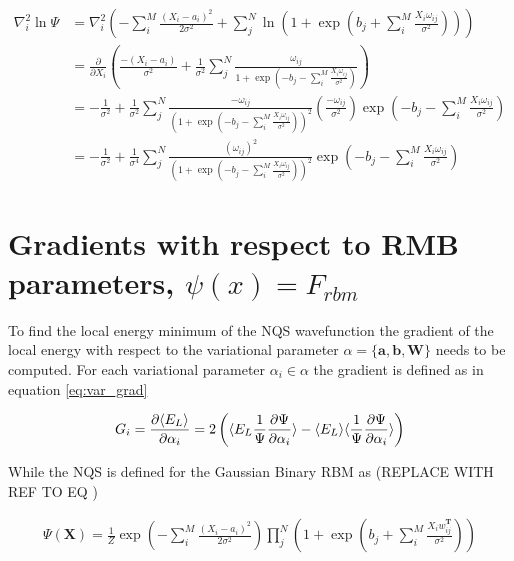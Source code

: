 \begin{align*}
\nabla_i^2 \ln \Psi &= \nabla_i^2 \left( - \sum_{i}^{M} \frac{(X_i - a_i)^2}{2 \sigma^2} +  \sum_{j}^{N} \ln \left( 1 + \exp \left( b_j + \sum_{i}^{M} \frac{X_i \omega_{ij}}{\sigma^2} \right) \right) \right) \\
&= \frac{\partial}{\partial X_i} \left( \frac{-(X_i - a_i)}{\sigma^2} + \frac{1}{\sigma^2} \sum_{j}^{N} \frac{\omega_{ij}}{1 + \exp \left( -b_j - \sum_{i}^{M} \frac{X_i \omega_{ij}}{\sigma^2} \right)} \right) \\
&= -\frac{1}{\sigma^2} + \frac{1}{\sigma^2} \sum_{j}^{N} \frac{-\omega_{ij}}{\left(1 + \exp \left( -b_j - \sum_{i}^{M} \frac{X_i \omega_{ij}}{\sigma^2} \right)\right)^2} \left( \frac{-\omega_{ij}}{\sigma^2} \right) \exp \left( -b_j - \sum_{i}^{M} \frac{X_i \omega_{ij}}{\sigma^2} \right) \\
&= -\frac{1}{\sigma^2} + \frac{1}{\sigma^4} \sum_{j}^{N} \frac{\left(\omega_{ij}\right)^2  }{\left(1 + \exp \left( -b_j - \sum_{i}^{M} \frac{X_i \omega_{ij}}{\sigma^2} \right)\right)^2}\exp \left( -b_j - \sum_{i}^{M} \frac{X_i \omega_{ij}}{\sigma^2} \right) 
\end{align*}

\section{Gradients with respect to RMB parameters, $\psi(x) = F_{rbm}$}\label{sec:GD}

To find the local energy minimum of the NQS wavefunction the  gradient of the local energy with respect to the variational parameter $\alpha  = \{\mathbf{a}, \mathbf{b}, \mathbf{W} \}$ needs to be computed. For each variational parameter $\alpha_i \in \alpha$ the gradient is defined as in equation \ref{eq:var_grad} 

\begin{equation}\label{eq:var_grad}
G_i = \frac{\partial \langle E_L \rangle}{\partial \alpha_i} = 2\left( \langle E_L \frac{1}{\Psi} \frac{\partial \Psi}{\partial \alpha_i} \rangle  - \langle E_L \rangle \langle  \frac{1}{\Psi} \frac{\partial \Psi}{\partial \alpha_i} \rangle\right)    
\end{equation}

\noindent While the NQS is defined for the Gaussian Binary RBM as (REPLACE WITH REF TO EQ )

\begin{align*}
\Psi (\mathbf{X}) = \frac{1}{Z} \exp\left(-\sum_i^M \frac{(X_i - a_i)^2}{2\sigma^2}\right) 
    \prod_j ^N \left( 1 + \exp\left(b_j  + \sum_i^M \frac{X_i w^\mathbf{T}_{ij}}{\sigma^2}\right) \right)
\end{align*}
    
